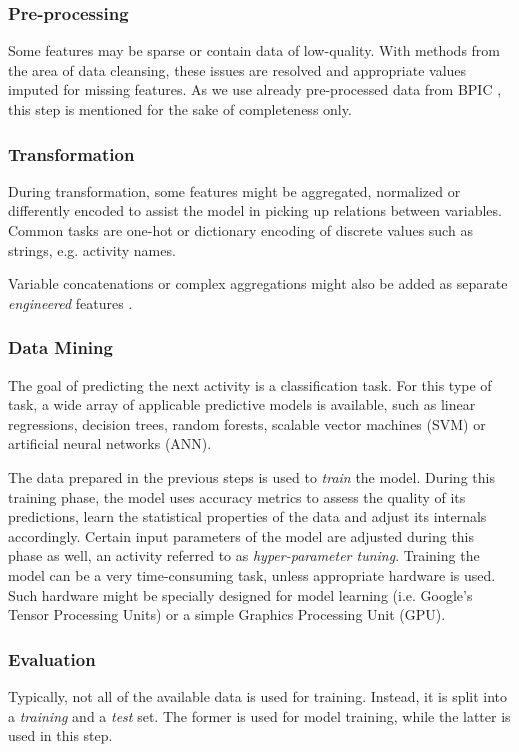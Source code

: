 \subsubsection*{Pre-processing}
Some features may be sparse or contain data of low-quality. With methods from the area of data cleansing, these issues are resolved and appropriate values imputed for missing features. As we use already pre-processed data from BPIC \cite{BPIC2011, BPIC2012, BPIC2017}, this step is mentioned for the sake of completeness only.

\subsubsection*{Transformation}
\label{sec:predictive-model-development:transformation}
During transformation, some features might be aggregated, normalized or differently encoded to assist the model in picking up relations between variables. Common tasks are one-hot or dictionary encoding of discrete values such as strings, e.g. activity names.

Variable concatenations or complex aggregations might also be added as separate \textit{engineered} features \cite{schoenig2018}.

\subsubsection*{Data Mining}
The goal of predicting the next activity is a classification task. For this type of task, a wide array of applicable predictive models is available, such as linear regressions, decision trees, random forests, scalable vector machines (SVM) or artificial neural networks (ANN).

The data prepared in the previous steps is used to \textit{train} the model. During this training phase, the model uses accuracy metrics to assess the quality of its predictions, learn the statistical properties of the data and adjust its internals accordingly. Certain input parameters of the model are adjusted during this phase as well, an activity referred to as \textit{hyper-parameter tuning}. Training the model can be a very time-consuming task, unless appropriate hardware is used. Such hardware might be specially designed for model learning (i.e. Google's Tensor Processing Units) or a simple Graphics Processing Unit (GPU).

\subsubsection*{Evaluation}
Typically, not all of the available data is used for training. Instead, it is split into a \textit{training} and a \textit{test} set. The former is used for model training, while the latter is used in this step.

